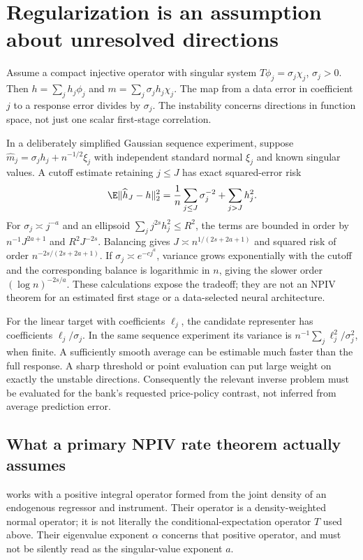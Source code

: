 \section{Regularization is an assumption about unresolved directions}
\label{r3:inverse-rates}
Assume a compact injective operator with singular system
$T\phi_j=\sigma_j\chi_j$, $\sigma_j>0$. Then
$h=\sum_j h_j\phi_j$ and $m=\sum_j\sigma_jh_j\chi_j$.
The map from a data error in coefficient $j$ to a response error divides
by $\sigma_j$. The instability concerns directions in function space,
not just one scalar first-stage correlation.

In a deliberately simplified Gaussian sequence experiment, suppose
$\widehat m_j=\sigma_jh_j+n^{-1/2}\xi_j$ with independent
standard normal $\xi_j$ and known singular values. A cutoff estimate
retaining $j\le J$ has exact squared-error risk
\begin{equation}
 \E\|\widehat h_J-h\|_2^2
 =\frac1n\sum_{j\le J}\sigma_j^{-2}+\sum_{j>J}h_j^2.
 \label{r3:inverse-risk}
\end{equation}
For $\sigma_j\asymp j^{-a}$ and an ellipsoid
$\sum_j j^{2s}h_j^2\le R^2$, the terms are bounded in order by
$n^{-1}J^{2a+1}$ and $R^2J^{-2s}$. Balancing gives
$J\asymp n^{1/(2s+2a+1)}$ and squared risk of order
$n^{-2s/(2s+2a+1)}$. If $\sigma_j\asymp e^{-cj^a}$, variance
grows exponentially with the cutoff and the corresponding balance is
logarithmic in $n$, giving the slower order $(\log n)^{-2s/a}$.
These calculations expose the tradeoff; they are not an NPIV theorem
for an estimated first stage or a data-selected neural architecture.

For the linear target with coefficients $\ell_j$, the candidate
representer has coefficients $\ell_j/\sigma_j$. In the same sequence
experiment its variance is
$n^{-1}\sum_j\ell_j^2/\sigma_j^2$, when finite. A sufficiently
smooth average can be estimable much faster than the full response.
A sharp threshold or point evaluation can put large weight on exactly
the unstable directions. Consequently the relevant inverse problem
must be evaluated for the bank's requested price-policy contrast,
not inferred from average prediction error.

\subsection{What a primary NPIV rate theorem actually assumes}
\citet[Section 2.1]{hall2005} works with a positive integral operator
formed from the joint density of an endogenous regressor and instrument.
Their operator is a density-weighted normal operator; it is not literally
the conditional-expectation operator $T$ used above. Their eigenvalue
exponent $\alpha$ concerns that positive operator, and must not be
silently read as the singular-value exponent $a$.

